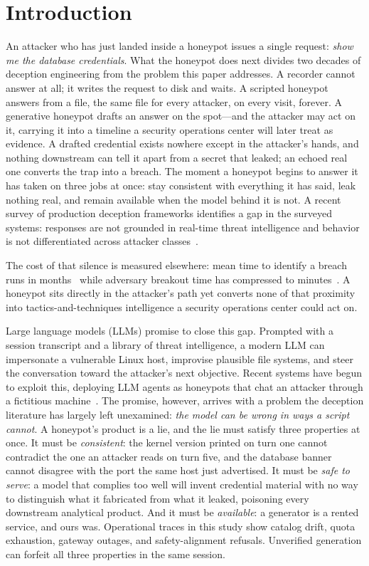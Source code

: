 \section{Introduction}
\label{sec:intro}

An attacker who has just landed inside a honeypot issues a single
request: \emph{show me the database credentials}. What the honeypot does
next divides two decades of deception engineering from the problem this
paper addresses. A recorder cannot answer at all; it writes the request
to disk and waits. A scripted honeypot answers from a file, the same file
for every attacker, on every visit, forever. A generative honeypot drafts
an answer on the spot---and the attacker may act on it, carrying it into
a timeline a security operations center will later treat as evidence. A
drafted credential exists nowhere except in the attacker's hands, and
nothing downstream can tell it apart from a secret that leaked; an
echoed real one converts the trap into a breach. The moment a honeypot
begins to answer it has taken on three jobs at once: stay consistent
with everything it has said, leak nothing real, and remain available
when the model behind it is not. A recent survey of production deception frameworks
identifies a gap in the surveyed systems: responses are not grounded in
real-time threat intelligence and behavior is not differentiated across
attacker classes~\cite{lopez2024}.

The cost of that silence is measured elsewhere: mean time to identify a
breach runs in months~\cite{ibm2024} while adversary breakout time has
compressed to minutes~\cite{crowdstrike2026}. A honeypot sits directly in
the attacker's path yet converts none of that proximity into
tactics-and-techniques intelligence a security operations center could act
on.

Large language models (LLMs) promise to close this gap. Prompted with a
session transcript and a library of threat intelligence, a modern LLM can
impersonate a vulnerable Linux host, improvise plausible file systems, and
steer the conversation toward the attacker's next objective. Recent systems
have begun to exploit this, deploying LLM agents as honeypots that chat an
attacker through a fictitious machine~\cite{reworr2024}. The promise,
however, arrives with a problem the deception literature has largely left
unexamined: \emph{the model can be wrong in ways a script cannot}. A
honeypot's product is a lie, and the lie must satisfy three properties at
once. It must be \emph{consistent}: the kernel version printed on turn one
cannot contradict the one an attacker reads on turn five, and the database
banner cannot disagree with the port the same host just advertised. It
must be \emph{safe to serve}: a model that complies too well will invent
credential material with no way to distinguish what it fabricated from
what it leaked, poisoning every downstream analytical product. And it
must be \emph{available}: a generator is a rented service, and ours was.
Operational traces in this study show catalog drift, quota exhaustion,
gateway outages, and safety-alignment refusals. Unverified generation can
forfeit all three properties in the same session.

